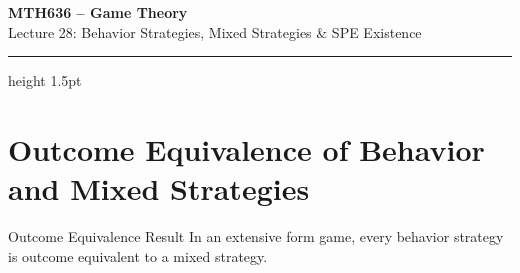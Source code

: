 \documentclass[12pt, a4paper]{article}
\begin{document}
\begin{center}
  {\LARGE\bfseries\sffamily\color{defblue} MTH636 -- Game Theory}\\[6pt]
  {\Large\sffamily Lecture 28: Behavior Strategies, Mixed Strategies \& SPE Existence}\\[4pt]
\end{center}
\vspace{0.5cm}
\hrule height 1.5pt
\vspace{0.3cm}

\section{Outcome Equivalence of Behavior and Mixed Strategies}

\begin{thmbox}{Outcome Equivalence Result}
In an extensive form game, every behavior strategy is outcome equivalent to a mixed strategy.
\end{thmbox}
\end{document}
